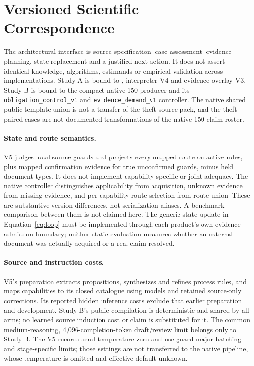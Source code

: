 \section{Versioned Scientific Correspondence}
\label{app:correspondence}


The architectural interface is source specification, case assessment,
evidence planning, state replacement and a justified next action. It does
not assert identical knowledge, algorithms, estimands or empirical
validation across implementations. Study A is bound to
, interpreter V4 and evidence
overlay V3. Study B is bound to the compact native-150 producer and its
\texttt{obligation\_control\_v1} and \texttt{evidence\_demand\_v1} controller.
The native shared public template union is not a transfer of the theft
source pack, and the theft paired cases are not documented transformations
of the native-150 claim roster.

\paragraph{State and route semantics.}
V5 judges local source guards and projects every mapped route on active
rules, plus mapped confirmation evidence for true unconfirmed guards,
minus held document types. It does not implement capability-specific or
joint adequacy. The native controller distinguishes applicability from
acquisition, unknown evidence from missing evidence, and per-capability
route selection from route union. These are substantive version differences,
not serialization aliases. A benchmark comparison between them is not
claimed here. The generic state update in Equation~\eqref{eq:loop} must be
implemented through each product's own evidence-admission boundary; neither
static evaluation measures whether an external document was actually
acquired or a real claim resolved.

\paragraph{Source and instruction costs.}
V5's preparation extracts propositions, synthesizes and refines process
rules, and maps capabilities to its closed catalogue using models and
retained source-only corrections. Its reported hidden inference costs
exclude that earlier preparation and development. Study B's public
compilation is deterministic and shared by all arms; no learned source
induction cost or claim is substituted for it. The common medium-reasoning,
4,096-completion-token draft/review limit belongs only to Study B. The
V5 records send temperature zero and use guard-major batching and
stage-specific limits; those settings are not transferred to the native
pipeline, whose temperature is omitted and effective default unknown.

